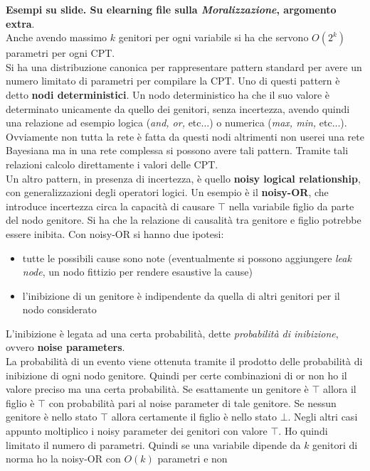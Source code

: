 \documentclass[a4paper,12pt, oneside]{book}
\begin{document}
\textbf{Esempi su slide. Su elearning file sulla \textit{Moralizzazione},
  argomento extra}.\\
Anche avendo massimo $k$ genitori per ogni variabile si ha che servono $O(2^k)$
parametri per ogni CPT.\\
Si ha una distribuzione canonica per rappresentare pattern standard per avere un
numero limitato di parametri per compilare la CPT. Uno di questi pattern è detto
\textbf{nodi deterministici}. Un nodo deterministico ha che il suo valore è
determinato unicamente da quello dei genitori, senza incertezza, avendo quindi
una relazione ad esempio logica (\textit{and, or,} etc$\ldots$) o numerica
(\textit{max, min, }etc$\ldots$). Ovviamente non tutta la rete è fatta da questi
nodi altrimenti non userei una rete Bayesiana ma in una rete complessa si
possono avere tali pattern. Tramite tali relazioni calcolo direttamente i valori
delle CPT.\\
Un altro pattern, in presenza di incertezza, è quello \textbf{noisy logical
  relationship}, con generalizzazioni degli operatori logici. Un esempio è il
\textbf{noisy-OR}, che introduce incertezza circa la capacità di causare $\top$
nella variabile figlio da parte del nodo genitore. Si ha che la relazione di
causalità tra genitore e figlio potrebbe essere inibita. Con noisy-OR si hanno due
ipotesi:
\begin{itemize}
  \item tutte le possibili cause sono note (eventualmente si possono aggiungere
  \textit{leak node}, un nodo fittizio per rendere esaustive la cause)
  \item l'inibizione di un genitore è indipendente da quella di altri genitori
  per il nodo considerato
\end{itemize}
L'inibizione è legata ad una certa probabilità, dette \textit{probabilità di
  inibizione}, ovvero \textbf{noise parameters}.\\
La probabilità di un evento viene ottenuta tramite il prodotto delle probabilità
di inibizione di ogni nodo genitore. Quindi per certe combinazioni di or non ho
il valore preciso ma una certa probabilità. Se esattamente un genitore è $\top$
allora il figlio è $\top$ con probabilità pari al noise parameter di tale
genitore. Se nessun genitore è nello stato $\top$ allora certamente il figlio è
nello stato $\bot$. Negli
altri casi appunto moltiplico i noisy parameter dei genitori con valore
$\top$. Ho quindi limitato il numero di parametri. Quindi se una variabile
dipende da $k$ genitori di norma ho la noisy-OR con $O(k)$ parametri e non
\end{document}
